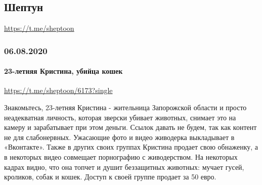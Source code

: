 \documentclass[a4paper,11pt]{book}
\newif\ifDEBUG
\begin{document}
  
 
 
\subsection{Шептун}
\url{https://t.me/sheptoon}
  
\vspace{0.5cm}
 {\ifDEBUG\small\LaTeX~section: \verb|tg.ch.sheptun| project: \verb|letopis| rootid: \verb|texdocs|	\fi}
\vspace{0.5cm}

 
 
\subsubsection{06.08.2020}
  
\vspace{0.5cm}
 {\ifDEBUG\small\LaTeX~section: \verb|tg.ch.sheptun.06_08_2020| project: \verb|letopis| rootid: \verb|texdocs|	\fi}
\vspace{0.5cm}
  

 
 
\paragraph{23-летняя Кристина, убийца кошек}
\url{https://t.me/sheptoon/6173?single}
  
\vspace{0.5cm}
 {\ifDEBUG\small\LaTeX~section: \verb|tg.ch.sheptun.06_08_2020.kristina_koshki| project: \verb|letopis| rootid: \verb|texdocs|	\fi}
\vspace{0.5cm}

Знакомьтесь, 23-летняя Кристина - жительница Запорожской области и просто
неадекватная личность, которая зверски убивает животных, снимает это на камеру
и зарабатывает при этом деньги. Ссылок давать не будем, так как контент не для
слабонервных.  Ужасающие фото и видео живодерка выкладывает в  «Вконтакте».
Также в других своих группах Кристина продает свою обнаженку, а в некоторых
видео совмещает порнографию с живодерством. На некоторых кадрах видно, что она
топчет и душит беззащитных животных: мучает гусей, кроликов, собак и кошек.
Доступ к своей группе продает за 50 евро. 
\end{document}
